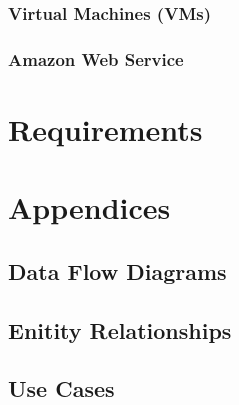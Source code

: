 \documentclass{article}
\begin{document}
        \subsubsection{Virtual Machines (VMs)}
        \subsubsection{Amazon Web Service}
\section{Requirements}
\section{Appendices}
	\subsection{Data Flow Diagrams}
    \subsection{Enitity Relationships}
    \subsection{Use Cases}
\end{document}
